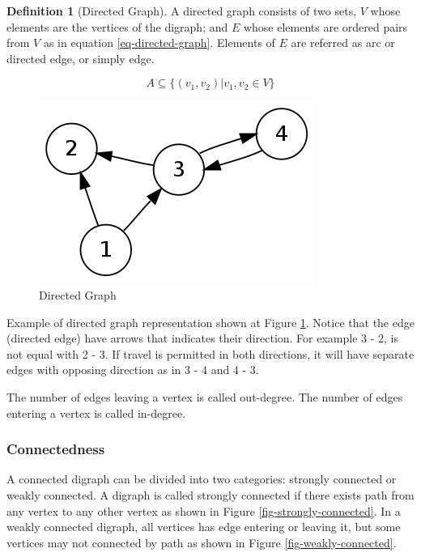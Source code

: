 \documentclass{article}
\theoremstyle{plain}%
\theoremstyle{definition}
\newtheorem{defn}{Definition}[section]
\theoremstyle{remark}
\begin{document}
	\begin{defn}[Directed Graph]
		A directed graph consists of two sets, $V$ whose elements are the vertices of the digraph; and $E$ whose elements are ordered pairs from $V$ as in equation \ref{eq-directed-graph}. Elements of $E$ are referred as arc or directed edge, or simply edge.
	\end{defn}

	\begin{equation}\label{eq-directed-graph}
		A \subseteq \{ (v_1, v_2) | v_1, v_2 \in V\}
	\end{equation}

	\begin{figure}[htbp]
		\center
		\includegraphics[scale=0.4]{img/directed-graph.png}
		\caption{Directed Graph}
		\label{fig-directed-graph}
	\end{figure}

	Example of directed graph representation shown at Figure \ref{fig-directed-graph}. Notice that the edge (directed edge) have arrows that indicates their direction. For example 3 - 2, is not equal with 2 - 3. If travel is permitted in both directions, it will have separate edges with opposing direction as in 3 - 4 and 4 - 3.

	The number of edges leaving a vertex is called out-degree. The number of edges entering a vertex is called in-degree.

	\subsubsection{Connectedness}

	A connected digraph can be divided into two categories: strongly connected or weakly connected. A digraph is called strongly connected if there exists path from any vertex to any other vertex as shown in Figure \ref{fig-strongly-connected}. In a weakly connected digraph, all vertices has edge entering or leaving it, but some vertices may not connected by path as shown in Figure \ref{fig-weakly-connected}.
\end{document}
